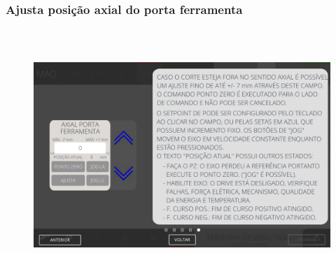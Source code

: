 \newpage
\thispagestyle{fancy}
\vspace*{40 pt}
\subsubsection{\small{Ajusta posição axial do porta ferramenta}}\label{telaAjustesPerfuradoraAjustaPosicaoAxialPortaFerramenta}
\vspace*{\fill}
\begin{figure}[h]
  \centering
  \includegraphics[width=576px,height=360px]{src/imagesFlexo/06-drilling/settings/e-5.png}
\end{figure}
\vspace*{\fill}

